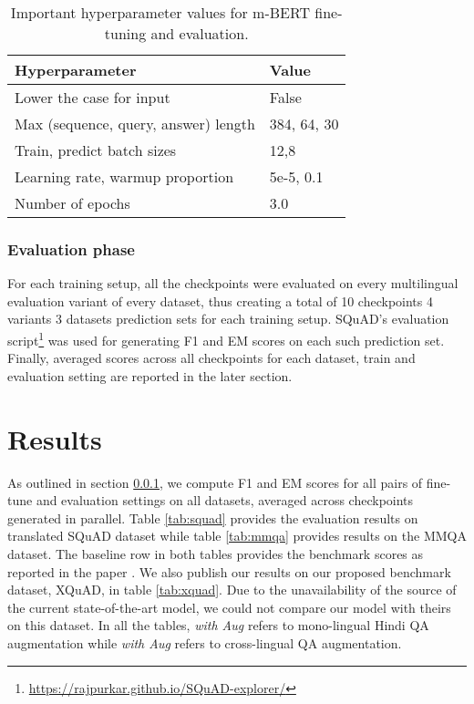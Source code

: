 \documentclass[acmsmall]{acmart}
\begin{document}
\begin{table}[h!]
\caption{Important hyperparameter values for m-BERT fine-tuning and evaluation.}
\begin{tabular}{l|l}
 \hline
Hyperparameter           &  Value \\ \hline
Lower the case for input             & False          \\ 
Max (sequence, query, answer) length & 384, 64, 30    \\ 
Train, predict batch sizes           & 12,8           \\ 
Learning rate, warmup proportion     & 5e-5, 0.1      \\ 
Number of epochs                     & 3.0            \\ \hline
\end{tabular}\label{tab:mbert}
\end{table}

\subsubsection{Evaluation phase} 
\label{evaluation}
For each training setup, all the checkpoints were evaluated on every multilingual evaluation variant of every dataset, thus creating a total of 10 checkpoints  4 variants   3 datasets  prediction sets for each training setup. SQuAD's evaluation script\footnote{\url{https://rajpurkar.github.io/SQuAD-explorer/}} was used for generating F1 and EM scores on each such prediction set. Finally, averaged scores across all checkpoints for each dataset, train and  evaluation  setting are reported in the later section.   


\section{Results}
\label{results}
As outlined in section \ref{evaluation}, we compute F1 and EM scores for all pairs of fine-tune and evaluation settings on all datasets, averaged across checkpoints generated in parallel. Table \ref{tab:squad} provides the evaluation results on translated SQuAD dataset while table \ref{tab:mmqa} provides results on the MMQA dataset. The baseline row in both tables provides the benchmark scores as reported in the paper \cite{latestMQA}. We also publish our results on our proposed benchmark dataset, XQuAD, in table \ref{tab:xquad}. Due to the unavailability of the source of the current state-of-the-art model, we could not compare our model with theirs on this dataset.  In all the tables, \textit{with  Aug} refers to mono-lingual Hindi QA augmentation while \textit{with  Aug} refers to cross-lingual QA augmentation.
 
\end{document}
